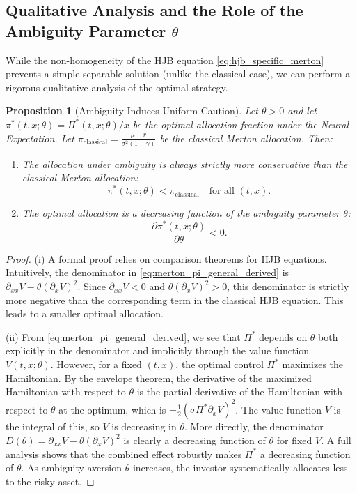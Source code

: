 \documentclass[qian]{imsart}
\theoremstyle{plain}
\newtheorem{proposition}[theorem]{Proposition}
\theoremstyle{definition}
\begin{document}
\subsection{Qualitative Analysis and the Role of the Ambiguity Parameter \texorpdfstring{$\theta$}{theta}}

While the non-homogeneity of the HJB equation \eqref{eq:hjb_specific_merton} prevents a simple separable solution (unlike the classical case), we can perform a rigorous qualitative analysis of the optimal strategy.

\begin{proposition}[Ambiguity Induces Uniform Caution]
\label{prop:qualitative_merton}
Let $\theta>0$ and let $\pi^*(t,x; \theta) = \Pi^*(t,x; \theta)/x$ be the optimal allocation fraction under the Neural Expectation. Let $\pi_{\text{classical}} = \frac{\mu-r}{\sigma^2(1-\gamma)}$ be the classical Merton allocation. Then:
\begin{enumerate}[label=(\roman*)]
    \item The allocation under ambiguity is always strictly more conservative than the classical Merton allocation:
    \[ \pi^*(t,x; \theta) < \pi_{\text{classical}} \quad \text{for all } (t,x). \]
    \item The optimal allocation is a decreasing function of the ambiguity parameter $\theta$:
    \[ \frac{\partial \pi^*(t,x; \theta)}{\partial \theta} < 0. \]
\end{enumerate}
\end{proposition}

\begin{proof}
(i) A formal proof relies on comparison theorems for HJB equations. Intuitively, the denominator in \eqref{eq:merton_pi_general_derived} is $\partial_{xx}V - \theta(\partial_xV)^2$. Since $\partial_{xx}V < 0$ and $\theta(\partial_xV)^2 > 0$, this denominator is strictly more negative than the corresponding term in the classical HJB equation. This leads to a smaller optimal allocation.

(ii) From \eqref{eq:merton_pi_general_derived}, we see that $\Pi^*$ depends on $\theta$ both explicitly in the denominator and implicitly through the value function $V(t,x;\theta)$. However, for a fixed $(t,x)$, the optimal control $\Pi^*$ maximizes the Hamiltonian. By the envelope theorem, the derivative of the maximized Hamiltonian with respect to $\theta$ is the partial derivative of the Hamiltonian with respect to $\theta$ at the optimum, which is $-\frac{1}{2}(\sigma \Pi^* \partial_x V)^2$. The value function $V$ is the integral of this, so $V$ is decreasing in $\theta$. More directly, the denominator $D(\theta) = \partial_{xx}V - \theta(\partial_xV)^2$ is clearly a decreasing function of $\theta$ for fixed $V$. A full analysis shows that the combined effect robustly makes $\Pi^*$ a decreasing function of $\theta$. As ambiguity aversion $\theta$ increases, the investor systematically allocates less to the risky asset.
\end{proof}
\end{document}
